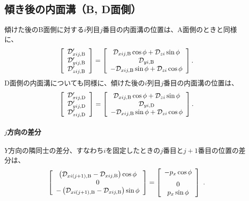 \subsection{傾き後の内面溝（B, D面側）}
傾けた後のB面側に対する$i$列目$j$番目の内面溝の位置は、A面側のときと同様に、
\begin{align*}
  \left[
  \begin{array}{c}
    \mathcal D_{xij,\text B}'\\
    \mathcal D_{yij,\text B}'\\
    \mathcal D_{zij,\text B}'
  \end{array}
  \right]
  = \left[
    \begin{array}{c}
      \mathcal D_{xij,\text B}\cos\phi+\mathcal D_{zi}\sin\phi\\
      \mathcal D_{yi,\text B}\\
      -\mathcal D_{xij,\text B}\sin\phi+\mathcal D_{zi}\cos\phi
    \end{array}
    \right].
\end{align*}
D面側の内面溝についても同様に、傾けた後の$i$列目$j$番目の内面溝の位置は、
\begin{align*}
  \left[
  \begin{array}{c}
    \mathcal D_{xij,\text D}'\\
    \mathcal D_{yij,\text D}'\\
    \mathcal D_{zij,\text D}'
  \end{array}
  \right]
  = \left[
    \begin{array}{c}
      \mathcal D_{xij,\text B}\cos\phi+\mathcal D_{zi}\sin\phi\\
      \mathcal D_{yi,\text D}\\
      -\mathcal D_{xij,\text B}\sin\phi+\mathcal D_{zi}\cos\phi
    \end{array}
    \right].
\end{align*}


\paragraph{$j$方向の差分}\noindent
$Y$方向の隣同士の差分、すなわち$i$を固定したときの$j$番目と$j+1$番目の位置の差分は、
\begin{align*}
  \left[
  \begin{array}{c}
    \left(\mathcal D_{xi(j+1),\text B}-\mathcal D_{xij,\text B}\right)\cos\phi\\
    0\\
    -\left(\mathcal D_{xi(j+1),\text B}-\mathcal D_{xij,\text B}\right)\sin\phi
  \end{array}
  \right]
  = \left[
    \begin{array}{c}
      -p_x\cos\phi\\[6pt]
      0\\
      p_x\sin\phi
    \end{array}
    \right]\ .
\end{align*}


